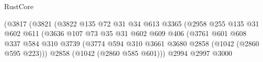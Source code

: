 \begin{lexlean}{RustCore}
\begin{coremodule}
                                              (@3817
                                                (@3821
                                                  (@3822
                                                    @135
                                                    @72
                                                    @31
                                                    @34
                                                    @613
                                                    @3365
                                                    (@2958
                                                      @255
                                                      @135
                                                      @31
                                                      @602
                                                      @611
                                                      (@3636
                                                        @107
                                                        @73
                                                        @35
                                                        @31
                                                        @602
                                                        @609
                                                        @406
                                                        (@3761
                                                          @601
                                                          @608
                                                          @337
                                                          @584
                                                          @310
                                                          @3739
                                                          (@3774
                                                            @594
                                                            @310
                                                            @3661
                                                            @3680
                                                            @2858
                                                            (@1042 (@2860 @595 @223)))
                                                          @2858
                                                          (@1042 (@2860 @585 @601)))
                                                        @2994
                                                        @2997
                                                        @3000

\end{coremodule}
\end{lexlean}
